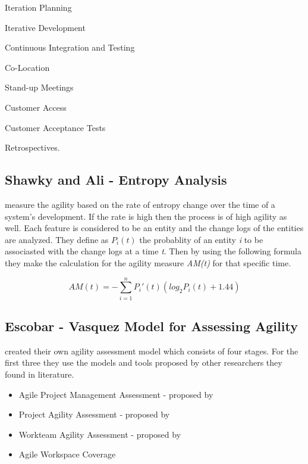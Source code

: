 \begin{inparaenum} [a\upshape)]
\item Iteration Planning
\item Iterative Development
\item Continuous Integration and Testing
\item Co-Location
\item Stand-up Meetings
\item Customer Access
\item Customer Acceptance Tests
\item Retrospectives.
\end{inparaenum}

\subsection{Shawky and Ali - Entropy Analysis}
\citet{entropy} measure the agility based on the rate of entropy change over the time of a system's development. If the rate is high then the process is of high agility as well. Each feature is considered to be an entity and the change logs of the entities are analyzed. They define as $P_i(t)$  the probablity of an entity \textit{i} to be associasted with the change logs at a time \textit{t}. Then by using the following formula they make the calculation for the agility measure \textit{AM(t)} for that specific time.

\begin{equation} AM(t) = - \sum_{i=1}^{n} P_i'(t) (log_2 P_i(t) + 1.44) \end{equation} 

\subsection{Escobar - Vasquez Model for Assessing Agility} %

\citet{6427226} created their own agility assessment model which consists of four stages. For the first three they use the models and tools proposed by other researchers they found in literature.
\begin{itemize}
\item Agile Project Management Assessment - proposed by \citet{qumer2006measuring}
\item Project Agility Assessment - proposed by \citet{taylor}
\item Workteam Agility Assessment - proposed by \citet{Leffingwell}
\item Agile Workspace Coverage
\end{itemize}

